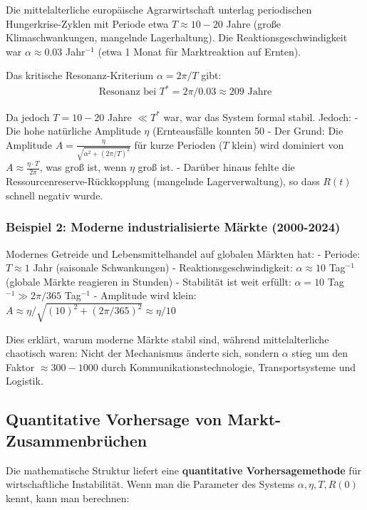 \documentclass[a4paper,12pt,twoside]{report}
\theoremstyle{definition}
\begin{document}
Die mittelalterliche europäische Agrarwirtschaft unterlag periodischen Hungerkrise-Zyklen mit Periode etwa $T \approx 10-20$ Jahre (große Klimaschwankungen, mangelnde Lagerhaltung). Die Reaktionsgeschwindigkeit war $\alpha \approx 0.03$ Jahr$^{-1}$ (etwa 1 Monat für Marktreaktion auf Ernten).

Das kritische Resonanz-Kriterium $\alpha = 2\pi/T$ gibt:
\begin{align}
\text{Resonanz bei } T^* = 2\pi / 0.03 \approx 209 \text{ Jahre}
\end{align}

Da jedoch $T = 10-20$ Jahre $\ll T^*$ war, war das System formal stabil. Jedoch:
- Die hohe natürliche Amplitude $\eta$ (Ernteausfälle konnten 50%
- Der Grund: Die Amplitude $A = \frac{\eta}{\sqrt{\alpha^2 + (2\pi/T)^2}}$ für kurze Perioden ($T$ klein) wird dominiert von $A \approx \frac{\eta \cdot T}{2\pi}$, was groß ist, wenn $\eta$ groß ist.
- Darüber hinaus fehlte die Ressourcenreserve-Rückkopplung (mangelnde Lagerverwaltung), so dass $R(t)$ schnell negativ wurde.

\subsubsection{Beispiel 2: Moderne industrialisierte Märkte (2000-2024)}

Modernes Getreide und Lebensmittelhandel auf globalen Märkten hat:
- Periode: $T \approx 1$ Jahr (saisonale Schwankungen)
- Reaktionsgeschwindigkeit: $\alpha \approx 10$ Tag$^{-1}$ (globale Märkte reagieren in Stunden)
- Stabilität ist weit erfüllt: $\alpha = 10$ Tag$^{-1} \gg 2\pi/365$ Tag$^{-1}$
- Amplitude wird klein: $A \approx \eta / \sqrt{(10)^2 + (2\pi/365)^2} \approx \eta / 10$

Dies erklärt, warum moderne Märkte stabil sind, während mittelalterliche chaotisch waren: Nicht der Mechanismus änderte sich, sondern $\alpha$ stieg um den Faktor $\approx 300-1000$ durch Kommunikationstechnologie, Transportsysteme und Logistik.

\subsection{Quantitative Vorhersage von Markt-Zusammenbrüchen}

Die mathematische Struktur liefert eine \textbf{quantitative Vorhersagemethode} für wirtschaftliche Instabilität. Wenn man die Parameter des Systems $\alpha, \eta, T, R(0)$ kennt, kann man berechnen:
\end{document}
